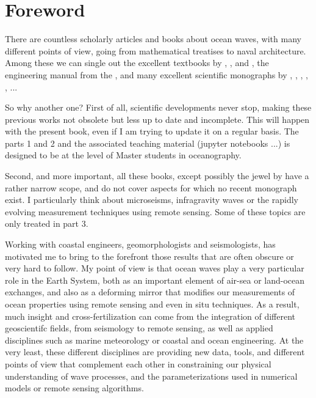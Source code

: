 \documentclass[a4paper]{book}  %
\begin{document}
\setcounter{page}{3}

\tableofcontents
\cleardoublepage


\setcounter{chapter}{0}

\chapter*{Foreword}\label{foreword}
There are countless scholarly articles and books about ocean waves, with many different points of view, going from 
mathematical treatises to naval architecture. Among these we can single out the excellent textbooks by 
\cite{Kinsman1965}, \cite{Dean&Dalrymple1991},  
and \cite{Holthuijsen2007}, the engineering manual from the \cite{USACE2002}, and many excellent scientific 
monographs by \cite{Phillips1977}, \cite{Dingemans1997a}, \cite{Young1999}, \cite{Lavrenov2003}, \cite{Janssen2004}, \cite{Lannes2013} ...  

So why another one? 
First of all, scientific developments never stop, making these previous works not obsolete but less up to date 
and incomplete. This will happen with the present book, even if I am trying to update it on a regular basis. The parts 1 and 2 
and the associated teaching material (jupyter notebooks ...)  is designed to be at the level of Master students in oceanography. 

Second, and more important, all these books, except possibly the jewel by \cite{Phillips1977} have a rather narrow 
scope, and do not cover aspects for which no recent monograph exist. I particularly think about microseisms, infragravity waves or the rapidly evolving
measurement techniques using remote sensing. Some of these topics are only treated in part 3.

Working with coastal engineers, geomorphologists and seismologists, has motivated me to bring to 
the forefront those results that are often obscure or very hard to follow. My point of view is that 
ocean waves play a very particular role in the Earth System, both as an important element of air-sea or land-ocean exchanges, and also as a deforming mirror that 
modifies our measurements of ocean properties using remote sensing and even in situ techniques. As a result, much insight and cross-fertilization 
can come from the integration of different geoscientifc fields, from 
seismology to remote sensing, as well as applied disciplines such as marine meteorology or coastal and ocean engineering.
At the very least, these different disciplines are providing new data, tools, and different points of view that complement each other 
in constraining  our physical understanding of wave processes, and the parameterizations used in numerical models or remote sensing algorithms. 
\end{document}
